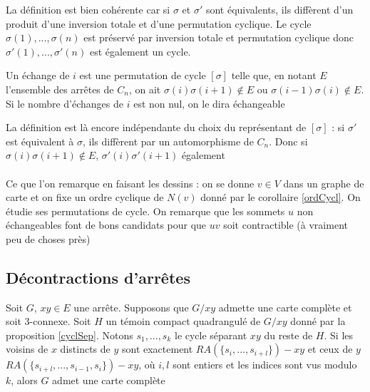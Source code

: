 \documentclass{scrartcl}
\begin{document}
\begin{flushleft}
La définition est bien cohérente car si $\sigma$ et $\sigma'$ sont équivalents, ils diffèrent d'un produit d'une inversion totale
et d'une permutation cyclique. Le cycle $\sigma(1), ..., \sigma(n)$ est préservé par inversion totale et permutation cyclique donc
$\sigma'(1), ..., \sigma'(n)$ est également un cycle.

\begin{def*}[Echange]
    Un échange de $i$ est une permutation de cycle $[\sigma]$ telle que, en notant $E$ l'ensemble des arrêtes de $C_n$,
    on ait $\sigma(i)\sigma(i+1) \notin E$ ou $\sigma(i-1)\sigma(i) \notin E$. Si le nombre d'échanges de $i$ est non nul,
    on le dira échangeable
\end{def*}

La définition est là encore indépendante du choix du représentant de $[\sigma]$ : si $\sigma'$ est équivalent à $\sigma$,
ils diffèrent par un automorphisme de $C_n$. Donc si $\sigma(i)\sigma(i+1) \notin E$, $\sigma'(i)\sigma'(i+1)$ également
\\~\\
Ce que l'on remarque en faisant les dessins : on se donne $v \in V$ dans un graphe de carte et on fixe un ordre
cyclique de $N(v)$ donné par le corollaire \ref{ordCycl}. On étudie ses permutations de cycle. On remarque que les sommets
$u$ non échangeables font de bons candidats pour que $uv$ soit contractible (à vraiment peu de choses près)


\subsection{Décontractions d'arrêtes}

\begin{prop}\label{ezDecontr}
    Soit $G$, $xy \in E$ une arrête. Supposons que $G / xy$ admette une carte complète et soit $3$-connexe. Soit $H$ un témoin compact
    quadrangulé de $G / xy$ donné par la proposition \ref{cyclSep}. Notons $s_1, ..., s_k$ le cycle séparant $xy$ du reste de $H$.
    Si les voisins de $x$ distincts de $y$ sont exactement $RA(\{s_i, ..., s_{i+l}\}) - xy$ et ceux de $y$
    $RA(\{s_{i+l}, ..., s_{i-1}, s_i\}) - xy$,
    où $i, l$ sont entiers et les indices sont vus modulo $k$, alors $G$ admet une carte complète
\end{prop}


\end{flushleft}
\end{document}
